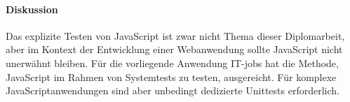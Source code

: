 \paragraph{Diskussion} Das explizite Testen von JavaScript ist zwar nicht Thema dieser Diplomarbeit, aber im Kontext der Entwicklung einer Webanwendung sollte JavaScript nicht unerwähnt bleiben. Für die vorliegende Anwendung IT-jobs hat die Methode, JavaScript im Rahmen von Systemtests zu testen, ausgereicht. Für komplexe JavaScriptanwendungen sind aber unbedingt dedizierte Unittests erforderlich.

